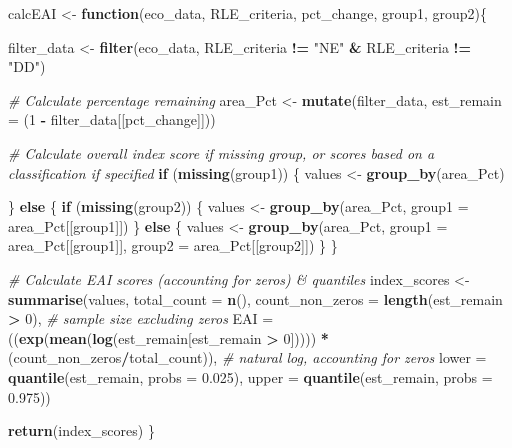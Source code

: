 \documentclass[]{article}
\newenvironment{Shaded}{\begin{snugshade}}{\end{snugshade}}
\newcommand{\KeywordTok}[1]{\textcolor[rgb]{0.13,0.29,0.53}{\textbf{#1}}}
\newcommand{\DataTypeTok}[1]{\textcolor[rgb]{0.13,0.29,0.53}{#1}}
\newcommand{\DecValTok}[1]{\textcolor[rgb]{0.00,0.00,0.81}{#1}}
\newcommand{\FloatTok}[1]{\textcolor[rgb]{0.00,0.00,0.81}{#1}}
\newcommand{\StringTok}[1]{\textcolor[rgb]{0.31,0.60,0.02}{#1}}
\newcommand{\CommentTok}[1]{\textcolor[rgb]{0.56,0.35,0.01}{\textit{#1}}}
\newcommand{\ControlFlowTok}[1]{\textcolor[rgb]{0.13,0.29,0.53}{\textbf{#1}}}
\newcommand{\OperatorTok}[1]{\textcolor[rgb]{0.81,0.36,0.00}{\textbf{#1}}}
\newcommand{\NormalTok}[1]{#1}
\begin{document}
\begin{Shaded}
\begin{Highlighting}[]
\NormalTok{calcEAI <-}\StringTok{ }\ControlFlowTok{function}\NormalTok{(eco_data, RLE_criteria, pct_change, group1, group2)\{}
  
\NormalTok{  filter_data <-}\StringTok{ }\KeywordTok{filter}\NormalTok{(eco_data, RLE_criteria }\OperatorTok{!=}\StringTok{ "NE"} \OperatorTok{&}\StringTok{ }\NormalTok{RLE_criteria }\OperatorTok{!=}\StringTok{ "DD"}\NormalTok{)}
  
  \CommentTok{# Calculate percentage remaining}
\NormalTok{  area_Pct <-}\StringTok{ }\KeywordTok{mutate}\NormalTok{(filter_data, }\DataTypeTok{est_remain =}\NormalTok{ (}\DecValTok{1} \OperatorTok{-}\StringTok{ }\NormalTok{filter_data[[pct_change]]))}
  
  \CommentTok{# Calculate overall index score if missing group, or scores based on a classification if specified}
  \ControlFlowTok{if}\NormalTok{ (}\KeywordTok{missing}\NormalTok{(group1)) \{}
\NormalTok{    values <-}\StringTok{ }\KeywordTok{group_by}\NormalTok{(area_Pct)}
    
\NormalTok{  \} }\ControlFlowTok{else}\NormalTok{ \{}
    \ControlFlowTok{if}\NormalTok{ (}\KeywordTok{missing}\NormalTok{(group2)) \{}
\NormalTok{      values <-}\StringTok{ }\KeywordTok{group_by}\NormalTok{(area_Pct, }\DataTypeTok{group1 =}\NormalTok{ area_Pct[[group1]])}
\NormalTok{    \} }\ControlFlowTok{else}\NormalTok{ \{}
\NormalTok{      values <-}\StringTok{ }\KeywordTok{group_by}\NormalTok{(area_Pct, }\DataTypeTok{group1 =}\NormalTok{ area_Pct[[group1]],}
                                  \DataTypeTok{group2 =}\NormalTok{ area_Pct[[group2]])}
\NormalTok{    \}}
\NormalTok{  \}}

  \CommentTok{# Calculate EAI scores (accounting for zeros) & quantiles}
\NormalTok{  index_scores <-}\StringTok{  }\KeywordTok{summarise}\NormalTok{(values, }\DataTypeTok{total_count =} \KeywordTok{n}\NormalTok{(),}
                             \DataTypeTok{count_non_zeros =} \KeywordTok{length}\NormalTok{(est_remain }\OperatorTok{>}\StringTok{ }\DecValTok{0}\NormalTok{), }\CommentTok{# sample size excluding zeros}
                             \DataTypeTok{EAI =}\NormalTok{ ((}\KeywordTok{exp}\NormalTok{(}\KeywordTok{mean}\NormalTok{(}\KeywordTok{log}\NormalTok{(est_remain[est_remain }\OperatorTok{>}\StringTok{ }\DecValTok{0}\NormalTok{])))) }\OperatorTok{*}\StringTok{ }\NormalTok{(count_non_zeros}\OperatorTok{/}\NormalTok{total_count)), }\CommentTok{# natural log, accounting for zeros}
                             \DataTypeTok{lower =} \KeywordTok{quantile}\NormalTok{(est_remain, }\DataTypeTok{probs =} \FloatTok{0.025}\NormalTok{), }
                             \DataTypeTok{upper =} \KeywordTok{quantile}\NormalTok{(est_remain, }\DataTypeTok{probs =} \FloatTok{0.975}\NormalTok{))}

  \KeywordTok{return}\NormalTok{(index_scores)}
\NormalTok{\}}
\end{Highlighting}
\end{Shaded}
\end{document}
